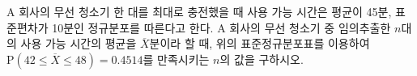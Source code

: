 \noindent\begin{minipage}[t]{0.58\linewidth}\vspace{0pt}\raggedright $\mathrm{A}$ 회사의 무선 청소기 한 대를 최대로 충전했을 때 사용 가능 시간은 평균이 45분, 표준편차가 10분인 정규분포를 따른다고 한다. $\mathrm{A}$ 회사의 무선 청소기 중 임의추출한 $n$대의 사용 가능 시간의 평균을 $\overline{X}$분이라 할 때, 위의 표준정규분포표를 이용하여 $\mathrm{P}(42\le\overline{X}\le 48)=0.4514$를 만족시키는 $n$의 값을 구하시오.\end{minipage}\hfill\begin{minipage}[t]{0.4\linewidth}\vspace{0pt}\centering \resizebox{\ifdim\width>\linewidth\linewidth\else\width\fi}{!}{}\end{minipage}\par
